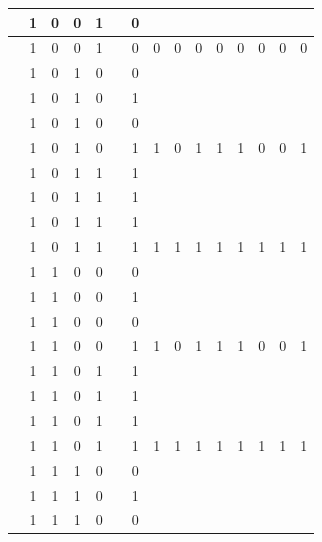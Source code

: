 \begin{table}[!tb]
\begin{tabular}{|c|c|c|c|c|c|c|c|c|c|c|c|c|c|c|}
        \rowcolor{yellow!40}  & 1 & 0 & 0 & 1 &  & 0 &  &  &  &  &  &  &  &  \\ \hline
        \rowcolor{yellow!40}  & 1 & 0 & 0 & 1 &  & 0 & 0 & 0 & 0 & 0 & 0 & 0 & 0 & 0 \\ \hline
        \rowcolor{gray!40}  & 1 & 0 & 1 & 0 &  & 0 &  &  &  &  &  &  &  &  \\ \hline
        \rowcolor{gray!40}  & 1 & 0 & 1 & 0 &  & 1 &  &  &  &  &  &  &  &  \\ \hline
        \rowcolor{gray!40}  & 1 & 0 & 1 & 0 &  & 0 &  &  &  &  &  &  &  &  \\ \hline
        \rowcolor{gray!40}  & 1 & 0 & 1 & 0 &  & 1 & 1 & 0 & 1 & 1 & 1 & 0 & 0 & 1 \\ \hline
        \rowcolor{blue!40}  & 1 & 0 & 1 & 1 &  & 1 &  &  &  &  &  &  &  &  \\ \hline
        \rowcolor{blue!40}  & 1 & 0 & 1 & 1 &  & 1 &  &  &  &  &  &  &  &  \\ \hline
        \rowcolor{blue!40}  & 1 & 0 & 1 & 1 &  & 1 &  &  &  &  &  &  &  &  \\ \hline
        \rowcolor{blue!40}  & 1 & 0 & 1 & 1 &  & 1 & 1 & 1 & 1 & 1 & 1 & 1 & 1 & 1 \\ \hline
        \rowcolor{red!40}  & 1 & 1 & 0 & 0 &  & 0 &  &  &  &  &  &  &  &  \\ \hline
        \rowcolor{red!40}  & 1 & 1 & 0 & 0 &  & 1 &  &  &  &  &  &  &  &  \\ \hline
        \rowcolor{red!40}  & 1 & 1 & 0 & 0 &  & 0 &  &  &  &  &  &  &  &  \\ \hline
        \rowcolor{red!40}  & 1 & 1 & 0 & 0 &  & 1 & 1 & 0 & 1 & 1 & 1 & 0 & 0 & 1 \\ \hline
        \rowcolor{green!40}  & 1 & 1 & 0 & 1 &  & 1 &  &  &  &  &  &  &  &  \\ \hline
        \rowcolor{green!40}  & 1 & 1 & 0 & 1 &  & 1 &  &  &  &  &  &  &  &  \\ \hline
        \rowcolor{green!40}  & 1 & 1 & 0 & 1 &  & 1 &  &  &  &  &  &  &  &  \\ \hline
        \rowcolor{green!40}  & 1 & 1 & 0 & 1 &  & 1 & 1 & 1 & 1 & 1 & 1 & 1 & 1 & 1 \\ \hline
        \rowcolor{yellow!40}  & 1 & 1 & 1 & 0 &  & 0 &  &  &  &  &  &  &  &  \\ \hline
        \rowcolor{yellow!40}  & 1 & 1 & 1 & 0 &  & 1 &  &  &  &  &  &  &  &  \\ \hline
        \rowcolor{yellow!40}  & 1 & 1 & 1 & 0 &  & 0 &  &  &  &  &  &  &  &  \\ \hline

\end{tabular}
\end{table}

